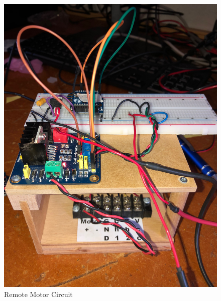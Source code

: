 \documentclass[letterpaper,12pt]{article}   %
\begin{document}
\begin{figure}
    \centering
    \includegraphics[scale=.1]{figs/ipe/Circuit10_29.JPG}
    \caption{Remote Motor Circuit}
    \label{fig:RRemoteCircuit1}
\end{figure}
\end{document}
